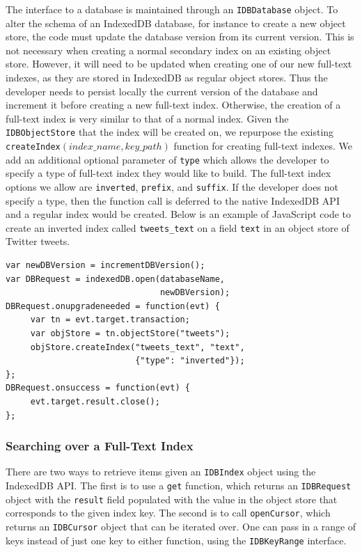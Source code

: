 \documentclass{vldb}
\begin{document}
The interface to a database is maintained through an \texttt{IDBDatabase} object.
To alter the schema of an IndexedDB database, for instance to create a new object store, the code must update the database version from its current version. This is not necessary when creating a normal secondary index on an existing object store. However, it will need to be updated when creating one of our new full-text indexes, as they are stored in IndexedDB as regular object stores. Thus the developer needs to persist locally the current version of the database and increment it before creating a new full-text index. Otherwise, the creation of a full-text index is very similar to that of a normal index. Given the \texttt{IDBObjectStore} that the index will be created on, we repurpose the existing \texttt{createIndex$\left(index\_name, key\_path\right)$} function for creating full-text indexes. We add an additional optional parameter of \texttt{type} which allows the developer to specify a type of full-text index they would like to build. The full-text index options we allow are \texttt{inverted}, \texttt{prefix}, and \texttt{suffix}. If the developer does not specify a type, then the function call is deferred to the native IndexedDB API and a regular index would be created. Below is an example of JavaScript code to create an inverted index called \texttt{tweets\_text} on a field \texttt{text} in an object store of Twitter tweets.

\begin{verbatim}
var newDBVersion = incrementDBVersion();
var DBRequest = indexedDB.open(databaseName,
                               newDBVersion);
DBRequest.onupgradeneeded = function(evt) {
     var tn = evt.target.transaction;	
     var objStore = tn.objectStore("tweets");
     objStore.createIndex("tweets_text", "text", 
                          {"type": "inverted"});
};
DBRequest.onsuccess = function(evt) {
     evt.target.result.close();
};
\end{verbatim}


\subsubsection{Searching over a Full-Text Index}

There are two ways to retrieve items given an \texttt{IDBIndex} object using the IndexedDB API. 
The first is to use a \texttt{get} function, which returns an \texttt{IDBRequest} object with the \texttt{result} field populated with the value in the object store that corresponds to the given index key. The second is to call \texttt{openCursor}, which returns an \texttt{IDBCursor} object that can be iterated over. One can pass in a range of keys instead of just one key to either function, using the \texttt{IDBKeyRange} interface.
\end{document}
